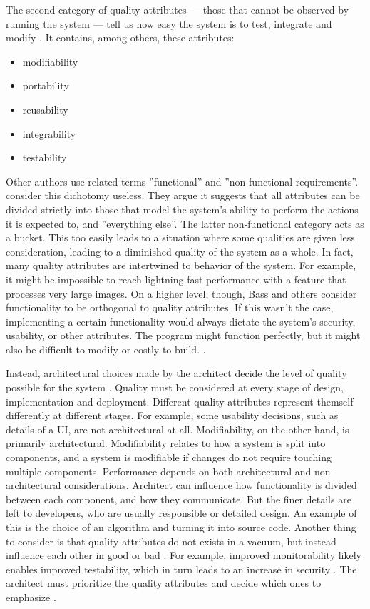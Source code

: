 \documentclass[utf8,english]{gradu3}
\begin{document}
The second category of quality attributes --- those that cannot be
observed by running the system --- tell us how easy the system is to test,
integrate and modify \parencite[81]{Bass1998}. It contains, among others, these
attributes:
\begin{itemize}
  \item modifiability
  \item portability
  \item reusability
  \item integrability
  \item testability
\end{itemize}

Other authors use related terms ''functional'' and ''non-functional
requirements''. \textcite[76]{Bass1998} consider this dichotomy useless. They argue it
suggests that all attributes can be divided strictly into those that model the
system's ability to perform the actions it is expected to, and ''everything
else''. The latter non-functional category acts as a bucket. This too easily
leads to a situation where some qualities are given less consideration, leading
to a diminished quality of the system as a whole. In fact, many quality
attributes are intertwined to behavior of the system. For example, it might be
impossible to reach lightning fast performance with a feature that processes
very large images. On a higher level, though, Bass and others consider
functionality to be orthogonal to quality attributes. If this wasn't the case,
implementing a certain functionality would always dictate the system's security,
usability, or other attributes. The program might function perfectly, but it
might also be difficult to modify or costly to build. \parencite[77]{Bass1998}.

Instead, architectural choices made by the architect decide the level of quality
possible for the system \parencite[72]{Bass2003}. Quality must be considered at
every stage of design, implementation and deployment.
Different quality attributes represent themself differently at different stages.
For example, some usability decisions, such as details of a UI, are not
architectural at all. Modifiability, on the other hand, is primarily
architectural. Modifiability relates to how a system is split into components,
and a system is modifiable if changes do not require touching multiple
components. Performance depends on both architectural and non-architectural
considerations. Architect can influence how functionality is divided between
each component, and how they communicate. But the finer details are left to
developers, who are usually responsible or detailed design. An example of this
is the choice of an algorithm and turning it into source code. Another thing to
consider is that quality attributes do not exists in a vacuum, but instead
influence each other in good or bad \parencite[78]{Bass1998}. For example,
improved monitorability likely enables improved testability, which in turn leads
to an increase in security \parencite[18]{Li2021}. The architect must prioritize the
quality attributes and decide which ones to emphasize \parencite[129]{Bass1998}.
\end{document}
